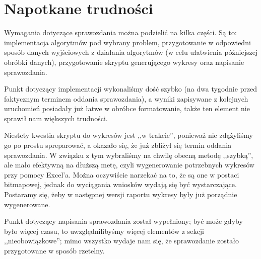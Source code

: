 \section{Napotkane trudności}
Wymagania dotyczące sprawozdania można podzielić na kilka części. Są to: implementacja algorytmów pod wybrany problem, przygotowanie w odpowiedni sposób danych wyjściowych z działania algorytmów (w celu ułatwienia późniejszej obróbki danych), przygotowanie skryptu generującego wykresy oraz napisanie sprawozdania.

Punkt dotyczący implementacji wykonaliśmy dość szybko (na dwa tygodnie przed faktycznym terminem oddania sprawozdania), a wyniki zapisywane z kolejnych uruchomień posiadały już łatwe w obróbce formatowanie, także ten element nie sprawił nam większych trudności.

Niestety kwestia skryptu do wykresów jest ,,w trakcie'', ponieważ nie zdążyliśmy go po prostu spreparować, a okazało się, że już zbliżył się termin oddania sprawozdania. W związku z tym wybraliśmy na chwilę obecną metodę ,,szybką'', ale mało efektywną na dłuższą metę, czyli wygenerowanie potrzebnych wykresów przy pomocy Excel'a. Można oczywiście narzekać na to, że są one w postaci bitmapowej, jednak do wyciągania wniosków wydają się być wystarczające. Postaramy się, żeby w następnej wersji raportu wykresy były już porządnie wygenerowane.

Punkt dotyczący napisania sprawozdania został wypełniony; być może gdyby było więcej czasu, to uwzględnilibyśmy więcej elementów z sekcji ,,nieobowiązkowe''; mimo wszystko wydaje nam się, że sprawozdanie zostało przygotowane w sposób rzetelny.